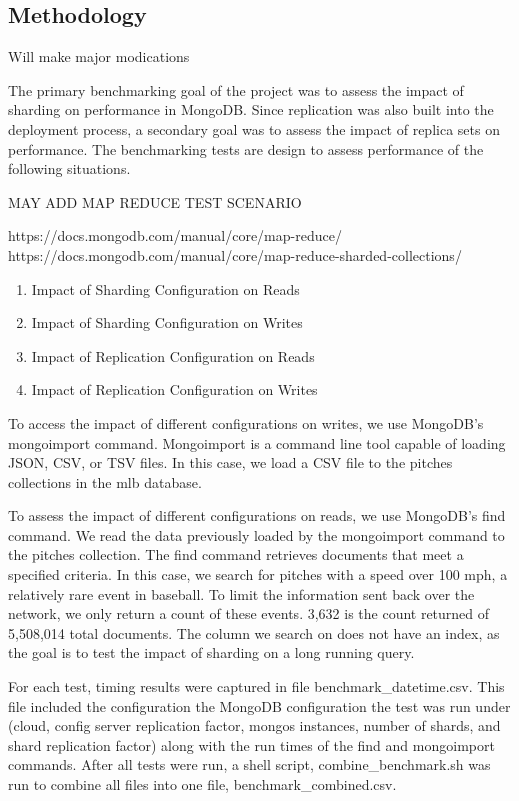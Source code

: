 \documentclass[9pt,twocolumn,twoside]{../../styles/osajnl}
\begin{document}
\subsection{Methodology}

Will make major modications

The primary benchmarking goal of the project was to assess the impact of sharding on performance in MongoDB.  Since replication was also built into the deployment process, a secondary goal was to assess the impact of replica sets on performance.  The benchmarking tests are design to assess performance of the following situations.

MAY ADD MAP REDUCE TEST SCENARIO

https://docs.mongodb.com/manual/core/map-reduce/
https://docs.mongodb.com/manual/core/map-reduce-sharded-collections/

\begin{enumerate}
\item Impact of Sharding Configuration on Reads
\item Impact of Sharding Configuration on Writes
\item Impact of Replication Configuration on Reads
\item Impact of Replication Configuration on Writes
\end{enumerate}

To access the impact of different configurations on writes, we use MongoDB's mongoimport command.  Mongoimport is a command line tool capable of loading JSON, CSV, or TSV files. \cite{www-mongoimport} In this case, we load a CSV file to the pitches collections in the mlb database.

To assess the impact of different configurations on reads, we use MongoDB's find command.  We read the data previously loaded by the mongoimport command to the pitches collection.  The find command retrieves documents that meet a specified criteria.  In this case, we search for pitches with a speed over 100 mph, a relatively rare event in baseball.  To limit the information sent back over the network, we only return a count of these events.  3,632 is the count returned of 5,508,014 total documents.  The column we search on does not have an index, as the goal is to test the impact of sharding on a long running query.


For each test, timing results were captured in file benchmark\_datetime.csv.  This file included the configuration the MongoDB configuration the test was run under (cloud, config server replication factor, mongos instances, number of shards, and shard replication factor) along with the run times of the find and mongoimport commands.  After all tests were run, a shell script, combine\_benchmark.sh was run to combine all files into one file, benchmark\_combined.csv.
\end{document}
